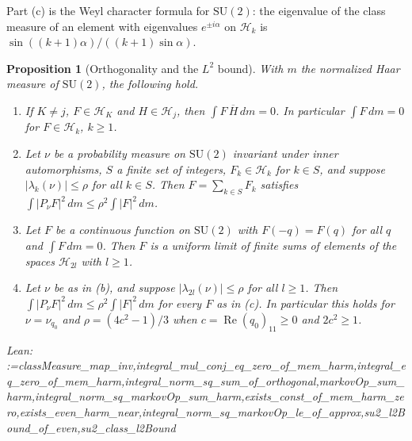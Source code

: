 \documentclass[11pt]{amsart}
\makeatletter
\newtheorem{proposition}[theorem]{Proposition}
\theoremstyle{definition}
\theoremstyle{remark}
\newcommand{\@leanlist}[1]{\def\@leansep{}\@for\@leanname:=#1\do{\@leansep
  \texttt{\expandafter\detokenize\expandafter{\@leanname}}\def\@leansep{, }}}
\newcommand{\lean}[1]{\par\smallskip\noindent
  {\footnotesize\normalfont\raggedright\textsf{Lean:} \@leanlist{#1}\par}}
\newcommand{\re}{\operatorname{Re}}
\makeatother
\begin{document}
Part (c) is the Weyl character formula for $\mathrm{SU}(2)$: the eigenvalue of the class measure
of an element with eigenvalues $e^{\pm i\alpha}$ on $\mathcal H_k$ is
$\sin((k+1)\alpha)/((k+1)\sin\alpha)$.

\begin{proposition}[Orthogonality and the $L^2$ bound]\label{prop:su2-l2}
With $m$ the normalized Haar measure of $\mathrm{SU}(2)$, the following hold.
\begin{enumerate}
\item[(a)] If $K\ne j$, $F\in\mathcal H_K$ and $H\in\mathcal H_j$, then
$\int F\,\overline H\,dm=0$.  In particular $\int F\,dm=0$ for $F\in\mathcal H_k$, $k\ge1$.
\item[(b)] Let $\nu$ be a probability measure on $\mathrm{SU}(2)$ invariant under inner
automorphisms, $S$ a finite set of integers, $F_k\in\mathcal H_k$ for $k\in S$, and suppose
$|\lambda_k(\nu)|\le\rho$ for all $k\in S$.  Then $F=\sum_{k\in S}F_k$ satisfies
$\int|P_\nu F|^2\,dm\le\rho^2\int|F|^2\,dm$.
\item[(c)] Let $F$ be a continuous function on $\mathrm{SU}(2)$ with $F(-q)=F(q)$ for all $q$
and $\int F\,dm=0$.  Then $F$ is a uniform limit of finite sums of elements of the spaces
$\mathcal H_{2l}$ with $l\ge1$.
\item[(d)] Let $\nu$ be as in (b), and suppose $|\lambda_{2l}(\nu)|\le\rho$ for all $l\ge1$.
Then $\int|P_\nu F|^2\,dm\le\rho^2\int|F|^2\,dm$ for every $F$ as in (c).  In particular this
holds for $\nu=\nu_{q_0}$ and $\rho=(4c^2-1)/3$ when $c=\re(q_0)_{11}\ge0$ and $2c^2\ge1$.
\end{enumerate}
\lean{classMeasure_map_inv,integral_mul_conj_eq_zero_of_mem_harm,integral_eq_zero_of_mem_harm,integral_norm_sq_sum_of_orthogonal,markovOp_sum_harm,integral_norm_sq_markovOp_sum_harm,exists_const_of_mem_harm_zero,exists_even_harm_near,integral_norm_sq_markovOp_le_of_approx,su2_l2Bound_of_even,su2_class_l2Bound}
\end{proposition}
\end{document}
